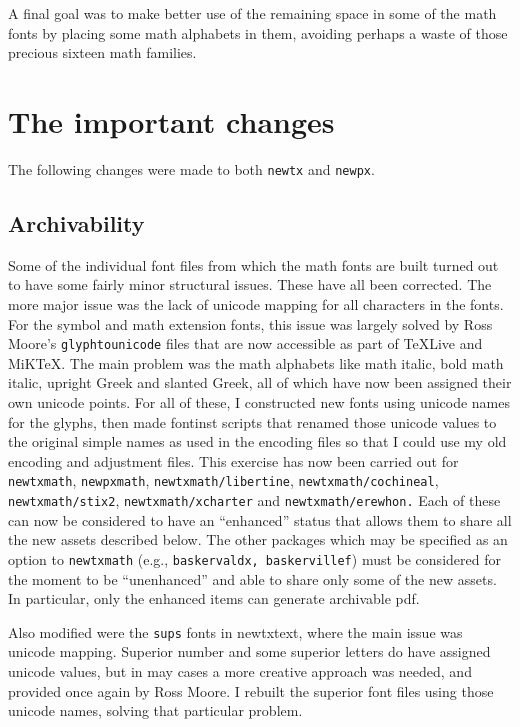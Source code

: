 \documentclass[11pt]{article}
\theoremstyle{oldplain}
\theoremstyle{plain}
\begin{document}
A final goal was to make better use of the remaining space in some of the math fonts by placing some math alphabets in them, avoiding perhaps a waste of those precious sixteen math families.

\section{The important changes}
The following changes were made to both {\tt newtx} and {\tt newpx}.

\subsection{Archivability}
Some of the individual font files from which the math fonts are built turned out to have some fairly minor structural issues. These have all been corrected. The more major issue was the lack of unicode mapping for all characters in the fonts. For the symbol and math extension fonts, this issue was largely solved by Ross Moore's {\tt glyphtounicode} files that are now accessible as part of TeXLive and MiKTeX. The main problem was the math alphabets like math italic, bold math italic, upright Greek and slanted Greek, all of which have now been assigned their own unicode points. For all of these, I constructed new fonts using unicode names for the glyphs, then made \textsf{fontinst} scripts that renamed those unicode values to the original simple names as used in the encoding files so that I could use my old encoding and adjustment files. This exercise has now been carried out for {\tt newtxmath}, {\tt newpxmath}, {\tt newtxmath/libertine}, {\tt newtxmath/cochineal}, {\tt newtxmath/stix2}, {\tt newtxmath/xcharter} and {\tt newtxmath/erewhon.} Each of these can now be considered to have an ``enhanced'' status that allows them to share all the new assets described below. 
 The other packages which may be specified as an option to {\tt newtxmath} (e.g., {\tt baskervaldx, baskervillef}) must be considered for the moment to be ``unenhanced'' and able to share only some of the new assets. In particular, only the enhanced items can generate archivable pdf. 

Also modified were the {\tt sups} fonts in {newtxtext}, where the main issue was unicode mapping. Superior number and some superior letters do have assigned unicode values, but in may cases a more creative approach was needed, and provided once again by Ross Moore. I rebuilt the superior font files using those unicode names, solving that particular problem.
\end{document}
